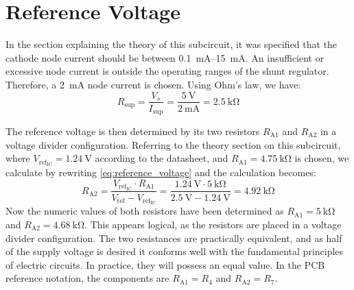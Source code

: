 \section{Reference Voltage}
In the section explaining the theory of this subcircuit, it was specified that the cathode node current should be between \SIrange{0.1}{15}{\milli\ampere}. An insufficient or excessive node current is outside the operating ranges of the shunt regulator. Therefore, a \SI{2}{\milli\ampere} node current is chosen. Using Ohm's law, we have:
\begin{equation}
	R_{\mathrm{sup}} = \frac{V_{s}}{I_{\mathrm{sup}}} = \frac{\SI{5}{\volt}}{\SI{2}{\milli\ampere}} = \SI{2.5}{\kilo\ohm}
\end{equation}

The reference voltage is then determined by its two resistors $R_{\mathrm{A1}}$ and $R_{\mathrm{A2}}$ in a voltage divider configuration. Referring to the theory section on this subcircuit, where $V_{\mathrm{ref}_{\mathrm{IC}}} = \SI{1.24}{\volt}$ according to the datasheet, and $R_{\mathrm{A1}} = \SI{4.75}{\kilo\ohm}$ is chosen, we calculate by rewriting \autoref{eq:reference_voltage} and the calculation becomes:
\begin{equation} \label{eq:reference_voltage_synth}
	R_{\mathrm{A2}} = \frac{V_{\mathrm{ref}_{\mathrm{IC}}} \cdot R_{\mathrm{A1}}}{V_{\mathrm{ref}} - V_{\mathrm{ref}_{\mathrm{IC}}}} = \frac{\SI{1.24}{\volt} \cdot \SI{5}{\kilo\ohm}}{\SI{2.5}{\volt} - \SI{1.24}{\volt}} = \SI{4.92}{\kilo\ohm}
\end{equation}
Now the numeric values of both resistors have been determined as $R_{\mathrm{A1}} = \SI{5}{\kilo\ohm}$ and $R_{\mathrm{A2}} = \SI{4.68}{\kilo\ohm}$. This appears logical, as the resistors are placed in a voltage divider configuration. The two resistances are practically equivalent, and as half of the supply voltage is desired it conforms well with the fundamental principles of electric circuits. In practice, they will possess an equal value.
In the PCB reference notation, the components are $R_{\mathrm{A1}} = R_{4}$ and $R_{\mathrm{A2}} = R_{7}$.

